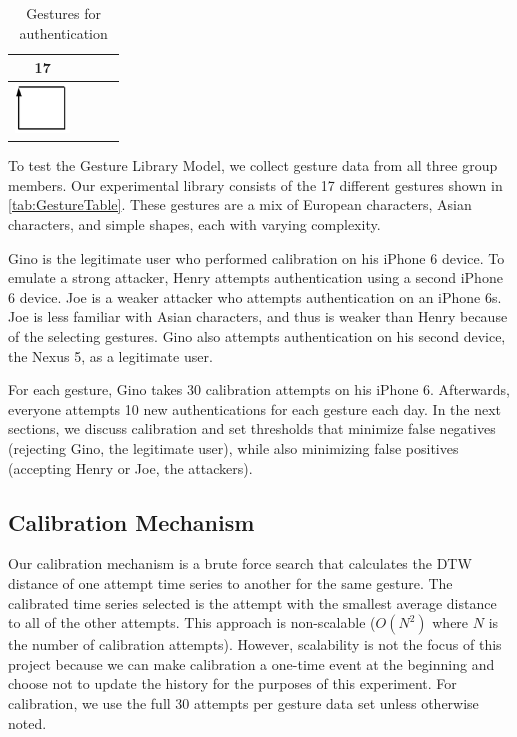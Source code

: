 \begin{table}
\begin{center}
\begin{tabular}{ c | c | c | c  }
    17    \\ \hline
    \includegraphics[width=0.2\linewidth, height=13mm]{./figures/gesture_17.png} \\ \hline
  \end{tabular}
\end{center}
\caption{Gestures for authentication} %
\label{table:GestureTable}
\end{table}


To test the Gesture Library Model, we collect gesture data from all three group members. Our experimental library consists of the 17 different gestures shown in \autoref{tab:GestureTable}. These gestures are a mix of European characters, Asian characters, and simple shapes, each with varying complexity. 

Gino is the legitimate user who performed calibration on his iPhone 6 device. To emulate a strong attacker, Henry attempts authentication using a second iPhone 6 device. Joe is a weaker attacker who attempts authentication on an iPhone 6s. Joe is less familiar with Asian characters, and thus is weaker than Henry because of the selecting gestures. Gino also attempts authentication on his second device, the Nexus 5, as a legitimate user.

For each gesture, Gino takes 30 calibration attempts on his iPhone 6. Afterwards, everyone attempts 10 new authentications for each gesture each day. In the next sections, we discuss calibration and set thresholds that minimize false negatives (rejecting Gino, the legitimate user), while also minimizing false positives (accepting Henry or Joe, the attackers).

\subsection{Calibration Mechanism}

Our calibration mechanism is a brute force search that calculates the \gls{DTW} distance of one attempt time series to another for the same gesture. The calibrated time series selected is the attempt with the smallest average distance to all of the other attempts. This approach is non-scalable ($O(N^{2})$ where $N$ is the number of calibration attempts). However, scalability is not the focus of this project because we can make calibration a one-time event at the beginning and choose not to update the history for the purposes of this experiment. For calibration, we use the full 30 attempts per gesture data set unless otherwise noted.

